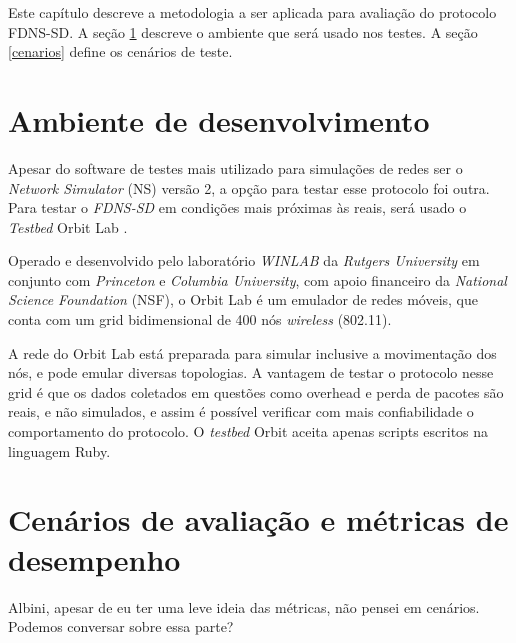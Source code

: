 
Este capítulo descreve a metodologia a ser aplicada para avaliação do protocolo
FDNS-SD. A seção \ref{ambiente} descreve o ambiente que será usado nos testes.
A seção \ref{cenarios} define os cenários de teste.

\section{Ambiente de desenvolvimento}
\label{ambiente}

    Apesar do software de testes mais utilizado para simulações de redes ser o
    \textit{Network Simulator} (NS) versão 2, a opção para testar esse protocolo
    foi outra. Para testar o \textit{FDNS-SD} em condições mais próximas às reais,
    será usado o \textit{Testbed} Orbit Lab \cite{orbit}.
    
    Operado e desenvolvido pelo laboratório \textit{WINLAB} \cite{winlab} da
    \textit{Rutgers University} em conjunto com \textit{Princeton} e
    \textit{Columbia University}, com apoio financeiro da \textit{National
    Science Foundation} (NSF), o Orbit Lab é um emulador de redes móveis, que
    conta com um grid bidimensional de 400 nós \textit{wireless} (802.11).

    A rede do Orbit Lab está preparada para simular inclusive a movimentação dos nós,
    e pode emular diversas topologias. A vantagem de testar o protocolo nesse grid é
    que os dados coletados em questões como overhead e perda de pacotes são reais, e
    não simulados, e assim é possível verificar com mais confiabilidade o comportamento
    do protocolo. O \textit{testbed} Orbit aceita apenas scripts escritos na linguagem
    Ruby.

\section{Cenários de avaliação e métricas de desempenho}

    Albini, apesar de eu ter uma leve ideia das métricas, não pensei em cenários.
    Podemos conversar sobre essa parte?